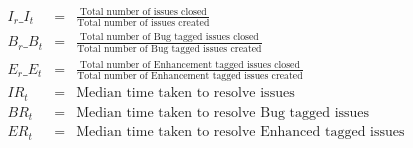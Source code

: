 \documentclass[sigconf]{acmart}
\newcommand{\bi}{\begin{itemize}[leftmargin=0.4cm]}
\newcommand{\ei}{\end{itemize}}
\theoremstyle{break}
\begin{document}
{\small
\begin{eqnarray}
I_r\_I_t& =& \frac{\text{Total number of issues closed}}{\text{Total number of issues created}}
    \\
  B_r\_B_t& =& \frac{\text{Total number of Bug tagged issues closed}}{\text{Total number of Bug tagged issues created}}
   \\
     E_r\_E_t& = &\frac{\text{Total number of Enhancement tagged issues closed}}{\text{Total number of Enhancement tagged issues created}}
    \\
     IR_t& = &\text{Median time taken to  resolve   issues}
    \\
    BR_t &=& \text{Median time taken  to resolve   Bug tagged issues}
    \\
   ER_t& =& \text{Median time taken to resolve Enhanced tagged issues}
    \end{eqnarray}}




\end{document}
